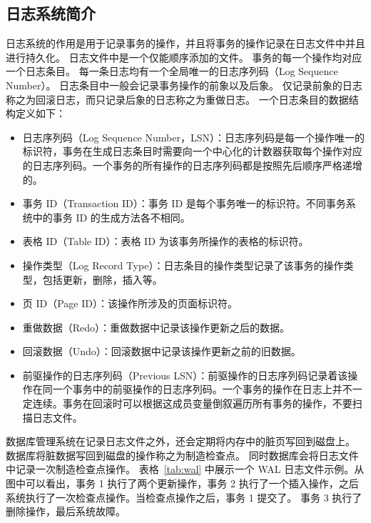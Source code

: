 \subsection{日志系统简介}

日志系统的作用是用于记录事务的操作，并且将事务的操作记录在日志文件中并且进行持久化。
日志文件中是一个仅能顺序添加的文件。
事务的每一个操作均对应一个日志条目。
每一条日志均有一个全局唯一的日志序列码（Log Sequence Number）。
日志条目中一般会记录事务操作的前象以及后象。
仅记录前象的日志称之为回滚日志，而只记录后象的日志称之为重做日志。
一个日志条目的数据结构定义如下：
\begin{itemize}
    \item 日志序列码（Log Sequence Number，LSN）：日志序列码是每一个操作唯一的标识符，事务在生成日志条目时需要向一个中心化的计数器获取每个操作对应的日志序列码。一个事务的所有操作的日志序列码都是按照先后顺序严格递增的。
    \item 事务 ID（Transaction ID）：事务 ID 是每个事务唯一的标识符。不同事务系统中的事务 ID 的生成方法各不相同。
    \item 表格 ID（Table ID）：表格 ID 为该事务所操作的表格的标识符。
    \item 操作类型（Log Record Type）：日志条目的操作类型记录了该事务的操作类型，包括更新，删除，插入等。
    \item 页 ID（Page ID）：该操作所涉及的页面标识符。
    \item 重做数据（Redo）：重做数据中记录该操作更新之后的数据。
    \item 回滚数据（Undo）：回滚数据中记录该操作更新之前的旧数据。
    \item 前驱操作的日志序列码（Previous LSN）：前驱操作的日志序列码记录着该操作在同一个事务中的前驱操作的日志序列码。一个事务的操作在日志上并不一定连续。事务在回滚时可以根据这成员变量倒叙遍历所有事务的操作，不要扫描日志文件。
\end{itemize}


数据库管理系统在记录日志文件之外，还会定期将内存中的脏页写回到磁盘上。
数据库将脏数据写回到磁盘的操作称之为制造检查点。
同时数据库会将日志文件中记录一次制造检查点操作。
表格~\ref{tab:wal} 中展示一个 WAL 日志文件示例。从图中可以看出，事务 1 执行了两个更新操作，事务 2 执行了一个插入操作，之后系统执行了一次检查点操作。当检查点操作之后，事务 1 提交了。
事务 3 执行了删除操作，最后系统故障。


